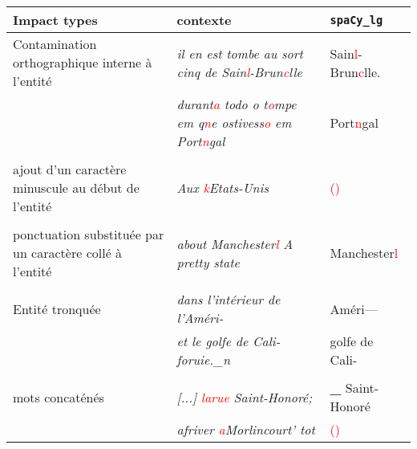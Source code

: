 \scriptsize{\begin{tabular}{|p{3.2cm}|p{4cm}|p{1.5cm}|}

\hline


\bf{Impact types} & \bf {contexte} &  \bf{\texttt{spaCy\_lg}}\\
\hline
 Contamination orthographique interne à l'entité& 
\textit{il en est tombe au sort cinq de Sain\textcolor{red}{l}-Brun\textcolor{red}{c}lle} & Sain\textcolor{red}{l}-Brun\textcolor{red}{c}lle. \\
&\textit{durant\textcolor{red}{a} todo o t\textcolor{red}{o}mpe
em q\textcolor{red}{n}e ostivess\textcolor{red}{o} em Port\textcolor{red}{n}gal}& Port\textcolor{red}{n}gal\\ 
& & \\
\rowcolor{lightgray}ajout d'un caractère minuscule au début de l'entité &\textit{Aux \textcolor{red}{k}Etats-Unis}& \textcolor{red}{()}\\
& & \\
ponctuation substituée par un caractère collé à l'entité &\textit{about Manchester\textcolor{red}{l} A
pretty state}&Manchester\textcolor{red}{l}\\
& & \\
\rowcolor{lightgray}Entité tronquée &\textit{dans l'intérieur de l'Améri-} & Améri—\\
\rowcolor{lightgray}&\textit{et le golfe de Cali-foruie.\_n}&golfe de Cali-\\
& & \\
mots concaténés & \textit{[...] \textcolor{red}{larue} Saint-Honoré;}& \textbf{\_} Saint-Honoré \\
&\textit{afriver \textcolor{red}{a}Morlincourt' tot}& \textcolor{red}{()}\\



\hline
\end{tabular}}


